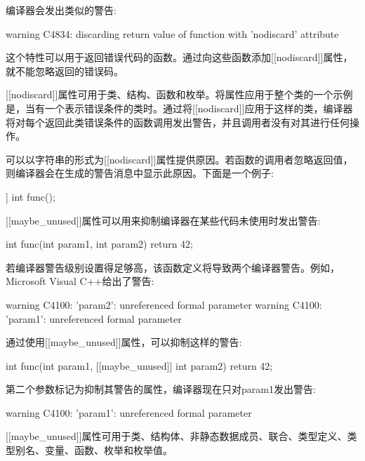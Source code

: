 编译器会发出类似的警告:

\begin{shell}
warning C4834: discarding return value of function with 'nodiscard' attribute
\end{shell}

这个特性可以用于返回错误代码的函数。通过向这些函数添加[[nodiscard]]属性，就不能忽略返回的错误码。

[[nodiscard]]属性可用于类、结构、函数和枚举。将属性应用于整个类的一个示例是，当有一个表示错误条件的类时。通过将[[nodiscard]]应用于这样的类，编译器将对每个返回此类错误条件的函数调用发出警告，并且调用者没有对其进行任何操作。

可以以字符串的形式为[[nodiscard]]属性提供原因。若函数的调用者忽略返回值，则编译器会在生成的警告消息中显示此原因。下面是一个例子:

\begin{cpp}
[[nodiscard("Some explanation")]] int func();
\end{cpp}


[[maybe\_unused]]属性可以用来抑制编译器在某些代码未使用时发出警告:

\begin{cpp}
int func(int param1, int param2)
{
    return 42;
}
\end{cpp}

若编译器警告级别设置得足够高，该函数定义将导致两个编译器警告。例如，Microsoft Visual C++给出了警告:

\begin{shell}
warning C4100: 'param2': unreferenced formal parameter
warning C4100: 'param1': unreferenced formal parameter
\end{shell}

通过使用[[maybe\_unused]]属性，可以抑制这样的警告:

\begin{cpp}
int func(int param1, [[maybe_unused]] int param2)
{
    return 42;
}
\end{cpp}

第二个参数标记为抑制其警告的属性，编译器现在只对param1发出警告:

\begin{shell}
warning C4100: 'param1': unreferenced formal parameter
\end{shell}

[[maybe\_unused]]属性可用于类、结构体、非静态数据成员、联合、类型定义、类型别名、变量、函数、枚举和枚举值。

\mySamllsection{[[noreturn]]}


